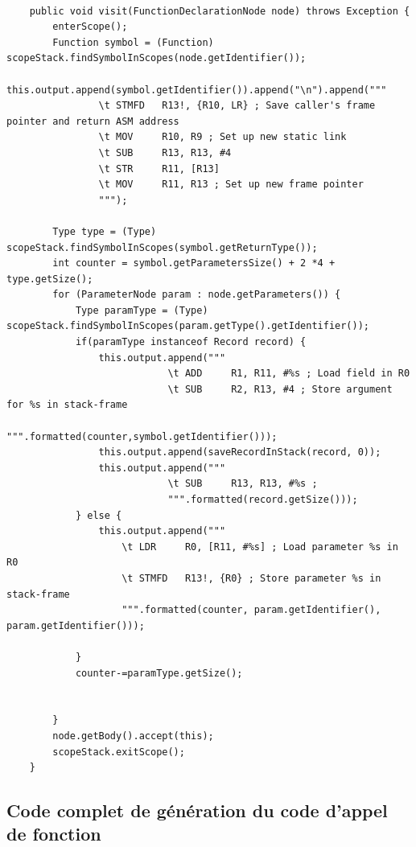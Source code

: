 \documentclass[french,a4paper]{article}
\begin{document}
    \begin{lstlisting}

    public void visit(FunctionDeclarationNode node) throws Exception {
        enterScope();
        Function symbol = (Function) scopeStack.findSymbolInScopes(node.getIdentifier());
        this.output.append(symbol.getIdentifier()).append("\n").append("""
                \t STMFD   R13!, {R10, LR} ; Save caller's frame pointer and return ASM address
                \t MOV     R10, R9 ; Set up new static link
                \t SUB     R13, R13, #4
                \t STR     R11, [R13]
                \t MOV     R11, R13 ; Set up new frame pointer
                """);

        Type type = (Type) scopeStack.findSymbolInScopes(symbol.getReturnType());
        int counter = symbol.getParametersSize() + 2 *4 + type.getSize();
        for (ParameterNode param : node.getParameters()) {
            Type paramType = (Type) scopeStack.findSymbolInScopes(param.getType().getIdentifier());
            if(paramType instanceof Record record) {
                this.output.append("""
                            \t ADD     R1, R11, #%s ; Load field in R0
                            \t SUB     R2, R13, #4 ; Store argument for %s in stack-frame
                            """.formatted(counter,symbol.getIdentifier()));
                this.output.append(saveRecordInStack(record, 0));
                this.output.append("""
                            \t SUB     R13, R13, #%s ;
                            """.formatted(record.getSize()));
            } else {
                this.output.append("""
                    \t LDR     R0, [R11, #%s] ; Load parameter %s in R0
                    \t STMFD   R13!, {R0} ; Store parameter %s in stack-frame
                    """.formatted(counter, param.getIdentifier(), param.getIdentifier()));

            }
            counter-=paramType.getSize();


        }
        node.getBody().accept(this);
        scopeStack.exitScope();
    }
    \end{lstlisting}


    \subsection{Code complet de génération du code d'appel de fonction}
\end{document}
